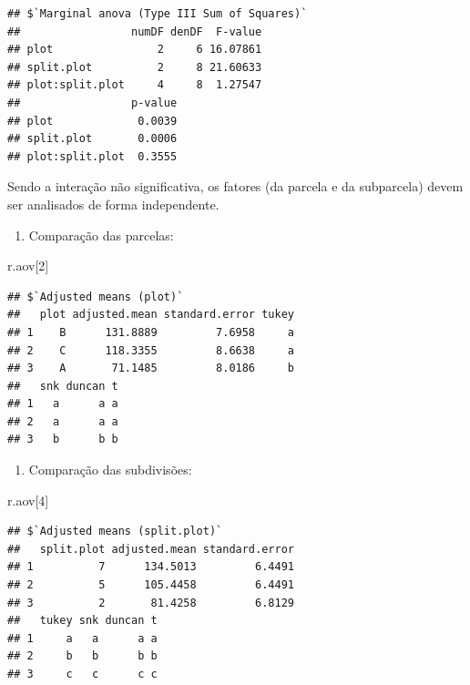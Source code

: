 \documentclass[
]{article}
\newenvironment{Shaded}{\begin{snugshade}}{\end{snugshade}}
\newcommand{\DecValTok}[1]{\textcolor[rgb]{0.00,0.00,0.81}{#1}}
\newcommand{\NormalTok}[1]{#1}
\providecommand{\tightlist}{%
  \setlength{\itemsep}{0pt}\setlength{\parskip}{0pt}}
\begin{document}
\begin{verbatim}
## $`Marginal anova (Type III Sum of Squares)`
##                 numDF denDF  F-value
## plot                2     6 16.07861
## split.plot          2     8 21.60633
## plot:split.plot     4     8  1.27547
##                 p-value
## plot             0.0039
## split.plot       0.0006
## plot:split.plot  0.3555
\end{verbatim}

Sendo a interação não significativa, os fatores (da parcela e da subparcela) devem ser analisados de forma independente.

\begin{enumerate}
\def\labelenumi{\arabic{enumi}.}
\tightlist
\item
  Comparação das parcelas:
\end{enumerate}

\begin{Shaded}
\begin{Highlighting}[]
\NormalTok{r.aov[}\DecValTok{2}\NormalTok{]}
\end{Highlighting}
\end{Shaded}

\begin{verbatim}
## $`Adjusted means (plot)`
##   plot adjusted.mean standard.error tukey
## 1    B      131.8889         7.6958     a
## 2    C      118.3355         8.6638     a
## 3    A       71.1485         8.0186     b
##   snk duncan t
## 1   a      a a
## 2   a      a a
## 3   b      b b
\end{verbatim}

\begin{enumerate}
\def\labelenumi{\arabic{enumi}.}
\setcounter{enumi}{1}
\tightlist
\item
  Comparação das subdivisões:
\end{enumerate}

\begin{Shaded}
\begin{Highlighting}[]
\NormalTok{r.aov[}\DecValTok{4}\NormalTok{]}
\end{Highlighting}
\end{Shaded}

\begin{verbatim}
## $`Adjusted means (split.plot)`
##   split.plot adjusted.mean standard.error
## 1          7      134.5013         6.4491
## 2          5      105.4458         6.4491
## 3          2       81.4258         6.8129
##   tukey snk duncan t
## 1     a   a      a a
## 2     b   b      b b
## 3     c   c      c c
\end{verbatim}
\end{document}
